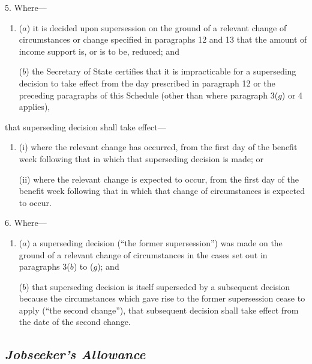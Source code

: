 \documentclass[12pt,a4paper]{article}
\begin{document}

\medskip

5.  Where—
\begin{enumerate}\item[]
($a$) it is decided upon supersession on the ground of a relevant change of circumstances 
or change specified in paragraphs 12 and 13  %
that the amount of income support is, or is to be, reduced; and

($b$) the Secretary of State certifies that it is impracticable for a superseding decision to take effect from the day prescribed in 
paragraph 12 or  %
the preceding paragraphs of this Schedule (other than where paragraph 3($g$)  or 4 applies),
\end{enumerate}
that superseding decision shall take effect—
\begin{enumerate}\item[]
(i) where the relevant change has occurred, from the first day of the benefit week following that in which that superseding decision is made; or

(ii) where the relevant change is expected to occur, from the first day of the benefit week following that in which that change of circumstances is expected to occur.
\end{enumerate}


\medskip

6.  Where—
\begin{enumerate}\item[]
($a$) a superseding decision (“the former supersession”) was made on the ground of a relevant change of circumstances in the cases set out in paragraphs 3($b$)  to ($g$); and

($b$) that superseding decision is itself superseded by a subsequent decision because the circumstances which gave rise to the former supersession cease to apply (“the second change”), that subsequent decision shall take effect from the date of the second change.
\end{enumerate}

\subsection*{\itshape Jobseeker’s Allowance}
\end{document}
